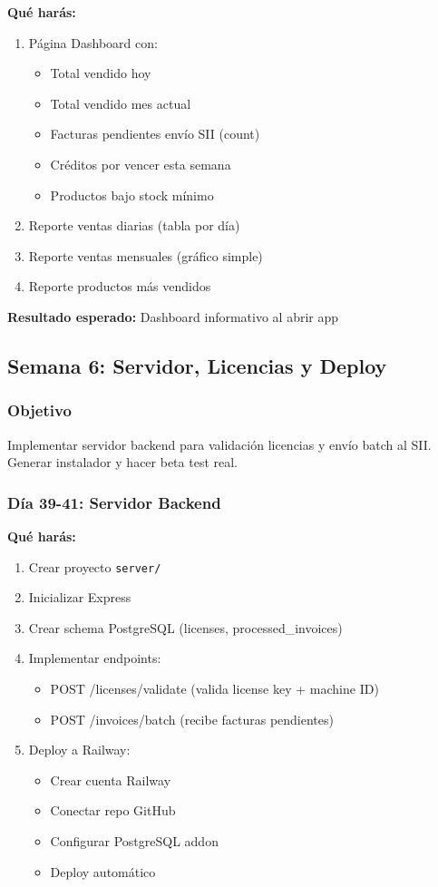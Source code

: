 \documentclass[11pt,a4paper]{article}
\begin{document}
\textbf{Qué harás:}
\begin{enumerate}
    \item Página Dashboard con:
    \begin{itemize}
        \item Total vendido hoy
        \item Total vendido mes actual
        \item Facturas pendientes envío SII (count)
        \item Créditos por vencer esta semana
        \item Productos bajo stock mínimo
    \end{itemize}
    \item Reporte ventas diarias (tabla por día)
    \item Reporte ventas mensuales (gráfico simple)
    \item Reporte productos más vendidos
\end{enumerate}

\textbf{Resultado esperado:} Dashboard informativo al abrir app

\newpage

\subsection{Semana 6: Servidor, Licencias y Deploy}

\subsubsection{Objetivo}
Implementar servidor backend para validación licencias y envío batch al SII. Generar instalador y hacer beta test real.

\subsubsection{Día 39-41: Servidor Backend}

\textbf{Qué harás:}
\begin{enumerate}
    \item Crear proyecto \texttt{server/}
    \item Inicializar Express
    \item Crear schema PostgreSQL (licenses, processed\_invoices)
    \item Implementar endpoints:
    \begin{itemize}
        \item POST /licenses/validate (valida license key + machine ID)
        \item POST /invoices/batch (recibe facturas pendientes)
    \end{itemize}
    \item Deploy a Railway:
    \begin{itemize}
        \item Crear cuenta Railway
        \item Conectar repo GitHub
        \item Configurar PostgreSQL addon
        \item Deploy automático
    \end{itemize}
\end{enumerate}
\end{document}
